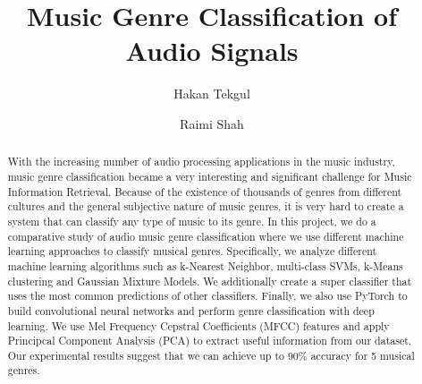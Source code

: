 \documentclass[sigconf]{acmart}
\begin{document}
\title{Music Genre Classification of Audio Signals}

\author{Hakan Tekgul}
\affiliation
{%
}

\author{Raimi Shah}




\begin{abstract}
With the increasing number of audio processing applications in the music industry, music genre classification became a very interesting and significant challenge for Music Information Retrieval. Because of the existence of thousands of genres from different cultures and the general subjective nature of music genres, it is very hard to create a system that can classify any type of music to its genre. In this project, we do a comparative study of audio music genre classification where we use different machine learning approaches to classify musical genres. Specifically, we analyze different machine learning algorithms such as k-Nearest Neighbor, multi-class SVMs, k-Means clustering and Gaussian Mixture Models. We additionally create a super classifier that uses the most common predictions of other classifiers. Finally, we also use PyTorch to build convolutional neural networks and perform genre classification with deep learning. We use Mel Frequency Cepstral Coefficients (MFCC) features and apply Principcal Component Analysis (PCA) to extract useful information from our dataset. Our experimental results suggest that we can achieve up to 90\% accuracy for 5 musical genres. 
\end{abstract}




\maketitle





\end{document}
